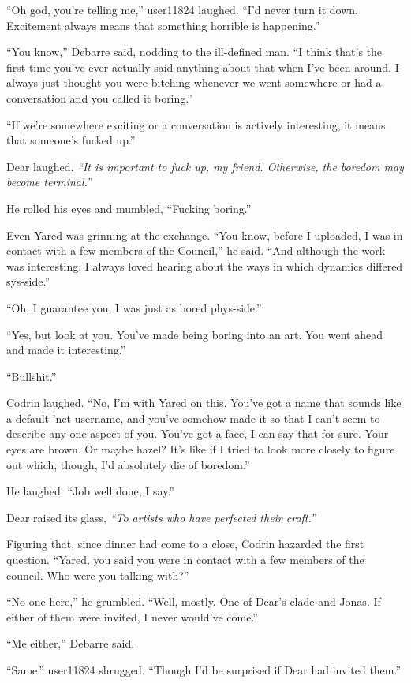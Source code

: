 ``Oh god, you're telling me,'' user11824 laughed. ``I'd never turn it down. Excitement always means that something horrible is happening.''

``You know,'' Debarre said, nodding to the ill-defined man. ``I think that's the first time you've ever actually said anything about that when I've been around. I always just thought you were bitching whenever we went somewhere or had a conversation and you called it boring.''

``If we're somewhere exciting or a conversation is actively interesting, it means that someone's fucked up.''

Dear laughed. \emph{``It is important to fuck up, my friend. Otherwise, the boredom may become terminal.''}

He rolled his eyes and mumbled, ``Fucking boring.''

Even Yared was grinning at the exchange. ``You know, before I uploaded, I was in contact with a few members of the Council,'' he said. ``And although the work was interesting, I always loved hearing about the ways in which dynamics differed sys-side.''

``Oh, I guarantee you, I was just as bored phys-side.''

``Yes, but look at you. You've made being boring into an art. You went ahead and made it interesting.''

``Bullshit.''

Codrin laughed. ``No, I'm with Yared on this. You've got a name that sounds like a default 'net username, and you've somehow made it so that I can't seem to describe any one aspect of you. You've got a face, I can say that for sure. Your eyes are brown. Or maybe hazel? It's like if I tried to look more closely to figure out which, though, I'd absolutely die of boredom.''

He laughed. ``Job well done, I say.''

Dear raised its glass, \emph{``To artists who have perfected their craft.''}

Figuring that, since dinner had come to a close, Codrin hazarded the first question. ``Yared, you said you were in contact with a few members of the council. Who were you talking with?''

``No one here,'' he grumbled. ``Well, mostly. One of Dear's clade and Jonas. If either of them were invited, I never would've come.''

``Me either,'' Debarre said.

``Same.'' user11824 shrugged. ``Though I'd be surprised if Dear had invited them.''

